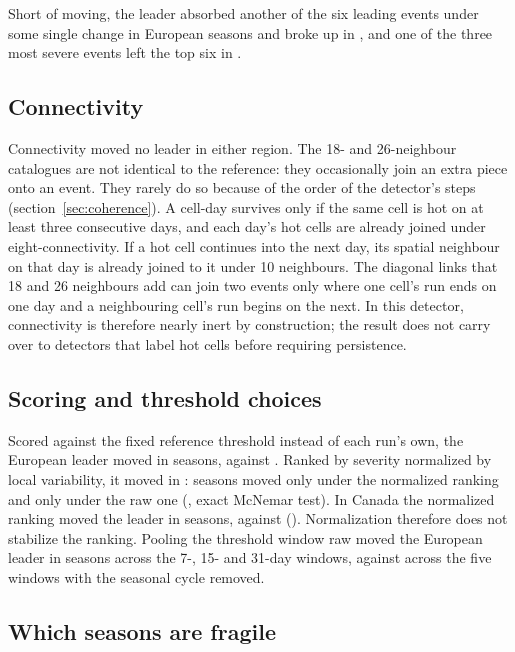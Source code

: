 \documentclass{amsdraft}
\begin{document}
Short of moving, the leader absorbed another of the six leading events under
some single change in \NLeaderAbsorbed{} European seasons and broke up in
\NLeaderSplit{}, and one of the three most severe events left the top six in
\NTopThreeLeft{}.

\subsection{Connectivity}
\label{sec:connectivity}

Connectivity moved no leader in either region. The 18- and 26-neighbour
catalogues are not identical to the reference: they occasionally join an
extra piece onto an event. They rarely do so because of the order of the
detector's steps (section~\ref{sec:coherence}). A cell-day survives only if
the same cell is hot on at least three consecutive days, and each day's hot
cells are already joined under eight-connectivity. If a hot cell continues
into the next day, its spatial neighbour on that day is already joined to it
under 10 neighbours. The diagonal links that 18 and 26 neighbours add can
join two events only where one cell's run ends on one day and a neighbouring
cell's run begins on the next. In this detector, connectivity is therefore
nearly inert by construction; the result does not carry over to detectors
that label hot cells before requiring persistence.

\subsection{Scoring and threshold choices}
\label{sec:metric}

Scored against the fixed reference threshold instead of each run's own, the
European leader moved in \NLeaderMovedRefBar{} seasons, against
\NLeaderMoved{}. Ranked by severity normalized by local variability, it
moved in \NLeaderMovedNorm{}: \NNormOnly{} seasons moved only under the
normalized ranking and \NSevOnly{} only under the raw one
(\PNormMcNemar{}, exact McNemar test). In Canada the normalized
ranking moved the leader in \NLeaderMovedNormCanada{} seasons, against
\NLeaderMovedCanada{} (\PNormMcNemarCanada{}). Normalization
therefore does not stabilize the ranking. Pooling the threshold window raw
moved the European leader in \NMovedRawWindow{} seasons across the 7-, 15-
and 31-day windows, against \NMovedWindow{} across the five windows with the
seasonal cycle removed.

\subsection{Which seasons are fragile}
\label{sec:predict}
\end{document}
